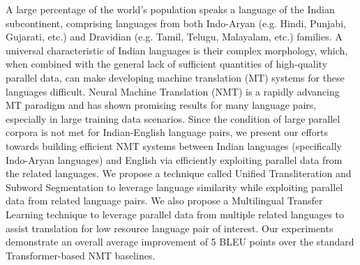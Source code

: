 A large percentage of the world's population speaks a language of the Indian subcontinent, comprising languages from both Indo-Aryan (e.g. Hindi, Punjabi, Gujarati, etc.) and Dravidian (e.g. Tamil, Telugu, Malayalam, etc.) families. A universal characteristic of Indian languages is their complex morphology, which, when combined with the general lack of sufficient quantities of high-quality parallel data, can make developing machine translation (MT) systems for these languages difficult. Neural Machine Translation (NMT) is a rapidly advancing MT paradigm and has shown promising results for many language pairs, especially in large training data scenarios. Since the condition of large parallel corpora is not met for Indian-English language pairs, we present our efforts towards building efficient NMT systems between Indian languages (specifically Indo-Aryan languages) and English via efficiently exploiting parallel data from the related languages. We propose a technique called Unified Transliteration and Subword Segmentation to leverage language similarity while exploiting parallel data from related language pairs. We also propose a Multilingual Transfer Learning technique to leverage parallel data from multiple related languages to assist translation for low resource language pair of interest. Our experiments demonstrate an overall average improvement of 5 BLEU points over the standard Transformer-based NMT baselines.
